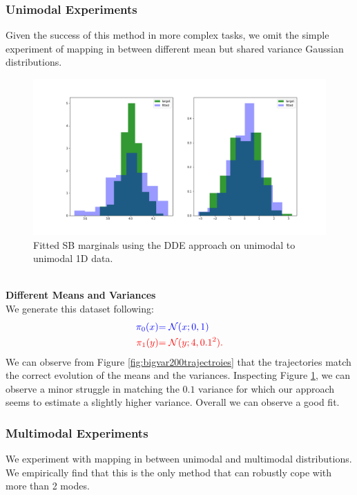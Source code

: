 \documentclass[a4paper,12pt,twoside,openright]{report}
\theoremstyle{definition}
\begin{document}
\subsubsection{Unimodal Experiments}
Given the success of this method in more complex tasks, we omit the simple experiment of mapping in between different mean but shared variance Gaussian distributions.
\begin{figure}
    \centering
    \includegraphics[scale=0.3,trim={2.3cm 1cm 2.5cm 0}, clip]{images/GP/gp_bigvar_boundaires.png}
    \caption{ Fitted SB marginals using the DDE approach on unimodal to unimodal 1D data.  }
    \label{fig:bigvar200boundaries}
\end{figure}
\\
\textbf{Different Means and Variances}\\
We generate this dataset following:
\begin{align*}
\color{blue}{\pi_0(x)} &\color{blue}{= {\mathcal{N}}(x; 0,  1)} \\
    \color{red}{\pi_1(y)} &\color{red}{= {\mathcal{N}}(y; 4, 0.1^2)}.
\end{align*}
We can observe from Figure \ref{fig:bigvar200trajectroies} that the trajectories match the correct evolution of the means and the variances. Inspecting Figure \ref{fig:bigvar200boundaries}, we can observe a minor struggle in matching the $0.1$ variance for which our approach seems to estimate a slightly higher variance. Overall we can observe a good fit.

\subsubsection{Multimodal Experiments}

We experiment with mapping in between unimodal and multimodal distributions. We empirically find that this is the only method that can robustly cope with more than 2 modes.
\end{document}

